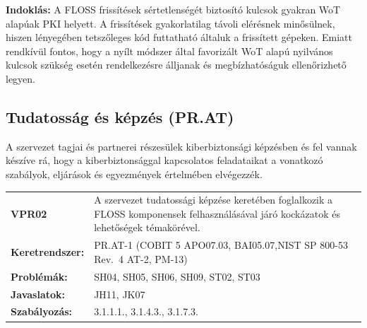\documentclass[12pt,magyar,a4paper,oneside]{scrreprt}
\begin{document}
\textbf{Indoklás: } A FLOSS frissítések sértetlenségét biztosító kulcsok
gyakran WoT alapúak PKI helyett. A frissítések gyakorlatilag távoli
elérésnek minősülnek, hiszen lényegében tetszőleges kód futtatható
általuk a frissített gépeken. Emiatt rendkívül fontos, hogy a nyílt
módszer által favorizált WoT alapú nyilvános kulcsok szükség esetén
rendelkezésre álljanak és megbízhatóságuk ellenőrizhető legyen.

\hypertarget{tudatossuxe1g-uxe9s-kuxe9pzuxe9s-pr.at}{%
\subsection{Tudatosság és képzés
(PR.AT)}\label{tudatossuxe1g-uxe9s-kuxe9pzuxe9s-pr.at}}

A szervezet tagjai és partnerei részesülek kiberbiztonsági képzésben és
fel vannak készíve rá, hogy a kiberbiztonsággal kapcsolatos feladataikat
a vonatkozó szabályok, eljárások és egyezmények értelmében elvégezzék.

\begin{longtable}[]{@{}ll@{}}
\toprule
\endhead
\begin{minipage}[t]{0.16\columnwidth}\raggedright
\textbf{VPR02}\strut
\end{minipage} & \begin{minipage}[t]{0.79\columnwidth}\raggedright
A szervezet tudatossági képzése keretében foglalkozik a FLOSS
komponensek felhasználásával járó kockázatok és lehetőségek
témakörével.\strut
\end{minipage}\tabularnewline
\begin{minipage}[t]{0.16\columnwidth}\raggedright
\textbf{Keretrendszer:}\strut
\end{minipage} & \begin{minipage}[t]{0.79\columnwidth}\raggedright
PR.AT-1 (COBIT 5 APO07.03, BAI05.07,NIST SP 800-53 Rev.~4 AT-2,
PM-13)\strut
\end{minipage}\tabularnewline
\begin{minipage}[t]{0.16\columnwidth}\raggedright
\textbf{Problémák:}\strut
\end{minipage} & \begin{minipage}[t]{0.79\columnwidth}\raggedright
SH04, SH05, SH06, SH09, ST02, ST03\strut
\end{minipage}\tabularnewline
\begin{minipage}[t]{0.16\columnwidth}\raggedright
\textbf{Javaslatok:}\strut
\end{minipage} & \begin{minipage}[t]{0.79\columnwidth}\raggedright
JH11, JK07\strut
\end{minipage}\tabularnewline
\begin{minipage}[t]{0.16\columnwidth}\raggedright
\textbf{Szabályozás:}\strut
\end{minipage} & \begin{minipage}[t]{0.79\columnwidth}\raggedright
3.1.1.1., 3.1.4.3., 3.1.7.3.\strut
\end{minipage}\tabularnewline
\bottomrule
\end{longtable}
\end{document}
